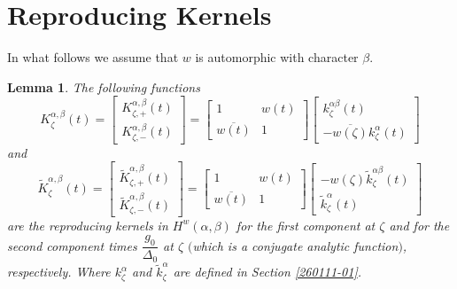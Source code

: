 \documentclass[reqno,11pt,centertags]{article}
\newtheorem{lemma}[theorem]{Lemma}
\theoremstyle{definition}
\def\be{\begin{equation}}
\def\ee{\end{equation}}
\def\D{\Delta}
\begin{document}
\section{Reproducing Kernels}
In what follows we assume that $w$ is automorphic with character $\beta$.
\begin{lemma}\label{June21-10}
The following functions
\be
K_{\zeta}^{\alpha, \beta}(t)=\left[\begin{array}{c} K_{\zeta,+}^{\alpha, \beta}(t) \\
K_{\zeta,-}^{\alpha, \beta}(t) \end{array}\right]
=\left[\begin{array}{cc} 1& w(t) \\
\overline{w(t)} & 1\end{array}\right]\left[\begin{array}{c} k^{\alpha\beta}_\zeta(t) \\
-\overline{w(\zeta)} k^\alpha_\zeta(t) \end{array}\right]
\label{12.8}
\ee
and
\be
\widetilde{K}_{\zeta}^{\alpha, \beta}(t)=
\left[\begin{array}{c} \widetilde{K}_{\zeta,+}^{\alpha, \beta}(t) \\
\widetilde{K}_{\zeta,-}^{\alpha, \beta}(t) \end{array}\right]
=\left[\begin{array}{cc} 1& w(t) \\
\overline{w(t)} & 1\end{array}\right]\left[\begin{array}{c} -w(\zeta)\widetilde k^{\alpha\beta}_\zeta(t) \\
\widetilde k^\alpha_\zeta(t) \end{array}\right]   \label{12.9}
\ee
are the reproducing kernels in $H^w(\alpha, \beta)$
for the first component at $\zeta$ and for the second component times
$\dfrac{g_0}{\D_0}$ at $\zeta$ $($which is a conjugate analytic function$)$, respectively.
Where $k^\alpha_\zeta$ and $\widetilde k^\alpha_\zeta$ are defined in Section \ref{260111-01}.
\end{lemma}
\end{document}

